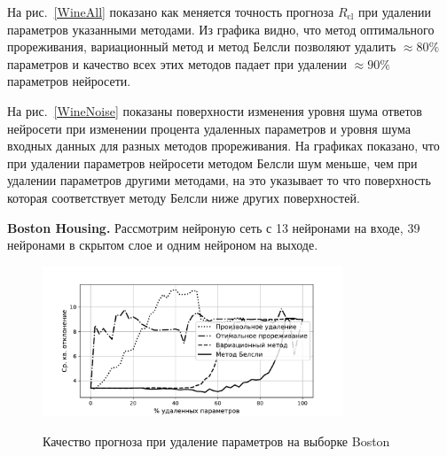 На рис.~\ref{WineAll} показано как меняется точность прогноза $R_{\text{cl}}$ при удалении параметров указанными методами. Из графика видно, что метод оптимального прореживания, вариационный метод и метод Белсли позволяют удалить $\approx80\%$ параметров и качество всех этих методов падает при удалении $\approx90\%$ параметров нейросети. 

На рис.~\ref{WineNoise} показаны поверхности изменения уровня шума ответов нейросети при изменении процента удаленных параметров и уровня шума входных данных для разных методов прореживания. На графиках показано, что при удалении параметров нейросети методом Белсли шум меньше, чем при удалении параметров другими методами, на это указывает то что поверхность которая соответствует методу Белсли ниже других поверхностей.

\textbf{Boston Housing.} Рассмотрим нейроную сеть с 13 нейронами на входе, 39 нейронами в скрытом слое и одним нейроном на выходе.

\begin{figure}[h!t]\center
\includegraphics[width=0.8\textwidth]{plots/grabovoy/Boston/All.pdf}\\
\caption{Качество прогноза при удаление параметров на выборке Boston}
\label{BostonAll}
\end{figure}


